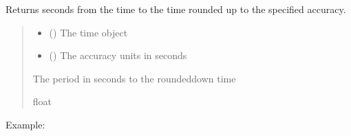 \documentclass[letterpaper,10pt,english]{sphinxmanual}
\begin{document}
\begin{fulllineitems}
\label{\detokenize{api_core:core.utils.time_floor_dist}}
\pysigstartsignatures
{}
\pysigstopsignatures
\sphinxAtStartPar
Returns seconds from the time to the time rounded up to the specified accuracy.
\begin{quote}\begin{description}
\begin{itemize}
\item {} 
\sphinxAtStartPar
{} () \textendash{} The time object

\item {} 
\sphinxAtStartPar
{} () \textendash{} The accuracy units in seconds

\end{itemize}

\sphinxAtStartPar
The period in seconds to the rounded\sphinxhyphen{}down time

\sphinxAtStartPar
float

\end{description}\end{quote}

\sphinxAtStartPar
Example:

\begin{sphinxVerbatim}[commandchars=\\\{\}]
    
         
 
 
\end{sphinxVerbatim}

\end{fulllineitems}
\end{document}
